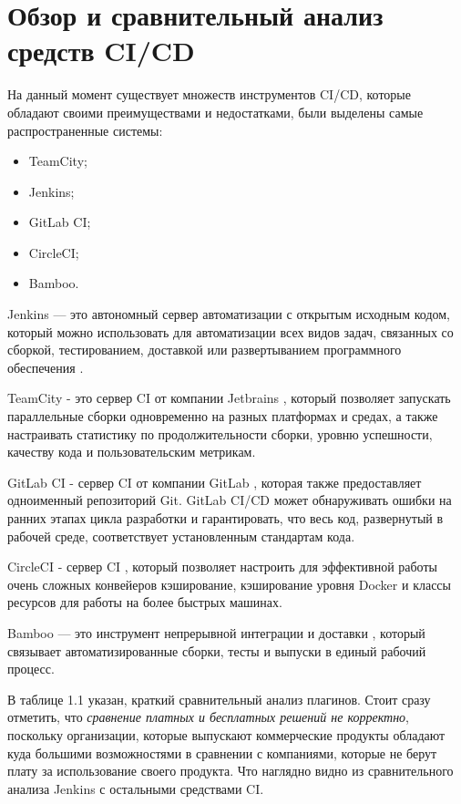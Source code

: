 \section{Обзор и сравнительный анализ средств CI/CD} \label{ch1:sec3}



На данный момент существует множеств инструментов CI/CD, которые обладают своими преимуществами и недостатками, были выделены самые распространенные системы:

\begin{itemize}
	\item TeamCity;
	\item Jenkins;
	\item GitLab CI;
	\item CircleCI;
	\item Bamboo.
\end{itemize}




Jenkins — это автономный сервер автоматизации с открытым исходным кодом, который можно использовать для автоматизации всех видов задач, связанных со сборкой, тестированием, доставкой или развертыванием программного обеспечения \cite{jenkins}.

TeamCity - это сервер CI от компании Jetbrains  \cite{tc}, который позволяет запускать параллельные сборки одновременно на разных платформах и средах, а также настраивать статистику по продолжительности сборки, уровню успешности, качеству кода и пользовательским метрикам.

GitLab CI - сервер CI от компании GitLab \cite{gitlab}, которая также предоставляет одноименный репозиторий Git. GitLab CI/CD может обнаруживать ошибки на ранних этапах цикла разработки и гарантировать, что весь код, развернутый в рабочей среде, соответствует установленным стандартам кода.

CircleCI - сервер CI \cite{circle}, который позволяет настроить для эффективной работы очень сложных конвейеров кэширование, кэширование уровня Docker и классы ресурсов для работы на более быстрых машинах.

Bamboo — это инструмент непрерывной интеграции и доставки  \cite{bamboo}, который связывает автоматизированные сборки, тесты и выпуски в единый рабочий процесс.

В таблице 1.1 указан, краткий сравнительный анализ плагинов. Стоит сразу отметить, что \textit{сравнение платных и бесплатных решений не корректно}, поскольку организации, которые выпускают коммерческие продукты обладают куда большими возможностями в сравнении с компаниями, которые не берут плату за использование своего продукта. Что наглядно видно из сравнительного анализа Jenkins с остальными средствами CI.

